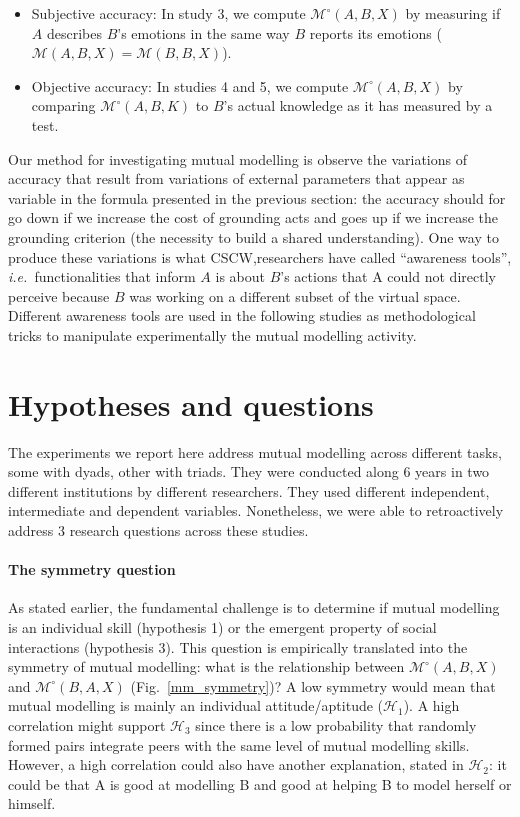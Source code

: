\documentclass[natbib]{svjour3}
\newcommand{\ie}{{\textit{i.e.\ }}}
\newcommand{\M}[3]{{\mathcal{M}(#1, #2, #3)}}
\newcommand{\Model}[3]{{$\mathcal{M}^{\circ}(#1, #2, #3)$}}
\begin{document}
\begin{itemize}

    \item Subjective accuracy: In study 3, we compute \Model{A}{B}{X} by
        measuring if $A$ describes $B$'s emotions in the same way $B$ reports
        its emotions ($\M{A}{B}{X} = \M{B}{B}{X}$).

    \item Objective accuracy: In studies 4 and 5, we compute \Model{A}{B}{X} by
        comparing \Model{A}{B}{K} to $B$'s actual knowledge as it has measured
        by a test.

\end{itemize}

Our method for investigating mutual modelling is observe the variations of
accuracy that result from variations of external parameters that appear as
variable in the formula presented in the previous section: the accuracy should
for go down if we increase the cost of grounding acts and goes up if we increase
the grounding criterion (the necessity to build a shared understanding). One way
to produce these variations is what CSCW,researchers have called ``awareness
tools'', \ie functionalities that inform $A$ is about $B$'s actions that A could
not directly perceive because $B$ was working on a different subset of the
virtual space. Different awareness tools are used in the following studies as
methodological tricks  to manipulate experimentally the  mutual modelling
activity. 


\section*{Hypotheses and questions}

The experiments we report here address mutual modelling across different tasks,
some with dyads, other with triads. They were conducted along 6 years in two
different institutions by different researchers. They used different
independent, intermediate and dependent variables. Nonetheless, we were able to
retroactively address 3 research questions across these studies. 

\paragraph{The symmetry question}

As stated earlier, the fundamental challenge is to determine if mutual modelling
is an individual skill (hypothesis 1) or  the emergent property of social
interactions (hypothesis 3).  This question is empirically translated into the
symmetry of mutual modelling: what is the relationship between \Model{A}{B}{X}
and \Model{B}{A}{X} (Fig.~\ref{mm_symmetry})? A low symmetry would mean that
mutual modelling is mainly an individual attitude/aptitude ($\mathcal{H}_{1}$).
A high correlation might support $\mathcal{H}_{3}$ since there is a low
probability that randomly formed pairs integrate peers with the same level of
mutual modelling skills. However, a high correlation could also have another
explanation, stated in  $\mathcal{H}_{2}$: it could be that A is good at
modelling B and good at helping B to model herself or himself.
\end{document}
